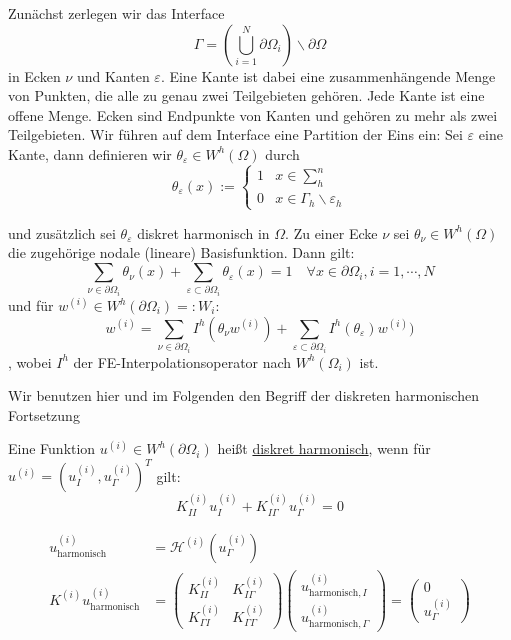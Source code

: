 Zunächst zerlegen wir das Interface 
\[
  \Gamma = \left( \bigcup_{i=1}^N \partial\Omega_i \right) \backslash \partial\Omega
\]
in Ecken $\nu$ und Kanten $\varepsilon$. Eine Kante ist dabei eine zusammenhängende Menge von Punkten, die alle zu genau zwei Teilgebieten gehören. Jede Kante ist eine offene Menge. Ecken sind Endpunkte von Kanten und gehören zu mehr als zwei Teilgebieten. Wir führen auf dem Interface eine Partition der Eins ein: 
Sei $\varepsilon$ eine Kante, dann definieren wir $\theta_{\varepsilon} \in W^h(\Omega)$ durch
\[
  \theta_{\varepsilon}(x):= 
  \begin{cases}
    1 &x\in \sum_h^n\\
    0 &x\in \Gamma_h\backslash\varepsilon_h
  \end{cases}
\]

und zusätzlich sei $\theta_\varepsilon$ diskret harmonisch in $\Omega$. Zu einer Ecke $\nu$ sei $\theta_\nu\in W^h(\Omega)$ die zugehörige nodale (lineare) Basisfunktion. Dann gilt: 
\[
  \sum_{\nu\in\partial\Omega_i} \theta_\nu(x) + \sum_{\varepsilon\subset\partial\Omega_i} \theta_\varepsilon(x) =1 \quad \forall x\in \partial\Omega_i, i=1,\cdots,N
\]
und für $w^{(i)}\in W^h(\partial\Omega_i)=: W_i$:
\[
  w^{(i)}=\sum_{\nu\in\partial\Omega_i} I^h(\theta_\nu w^{(i)})+\sum_{\varepsilon\subset\partial\Omega_i} I^h(\theta_\varepsilon)w^{(i)})
\],
wobei $I^h$ der FE-Interpolationsoperator nach $W^h(\Omega_i)$ ist. 

Wir benutzen hier und im Folgenden den Begriff der diskreten harmonischen Fortsetzung

\begin{definition}
  Eine Funktion $u^{(i)}\in W^h(\partial\Omega_i)$ heißt \underline{diskret harmonisch}, wenn für $u^{(i)}=(u_I^{(i)},u_\Gamma^{(i)})^T$ gilt:
  \[
    K_{II}^{(i)}u_I^{(i)}+K_{I\Gamma}^{(i)}u_\Gamma^{(i)} = 0 
  \]

  \begin{align*}
    u^{(i)}_{\text{harmonisch}} &= \mathcal{H}^{(i)}(u_{\Gamma}^{(i)})\\
    K^{(i)}u_{\text{harmonisch}}^{(i)} &= 
    \begin{pmatrix}
      K_{II}^{(i)} & K_{I\Gamma}^{(i)}\\
      K_{\Gamma I}^{(i)} & K_{\Gamma\Gamma}^{(i)}
    \end{pmatrix}
    \begin{pmatrix}
      u_{\text{harmonisch},I}^{(i)}\\
      u_{\text{harmonisch},\Gamma}^{(i)}
    \end{pmatrix}
    =
    \begin{pmatrix}
      0\\
      u_{\Gamma}^{(i)}
    \end{pmatrix}
  \end{align*}
\end{definition}
